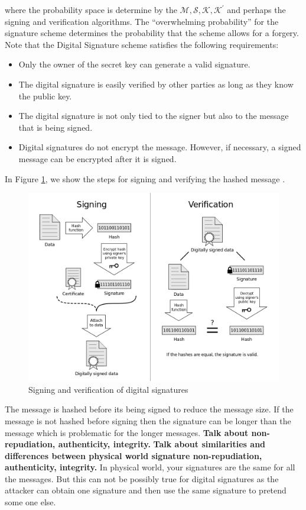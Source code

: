 	where the probability space is determine by the $\mathcal {M, S, K, K^{'}}$ and perhaps the signing and verification algorithms.
	The ``overwhelming probability'' for the signature scheme determines the probability that the scheme allows for a forgery.
	Note that the Digital Signature scheme satisfies the following requirements:
		\begin{itemize}
			\item Only the owner of the secret key can generate a valid signature.
			\item The digital signature is easily verified by other parties as long as they know the public key.
			\item The digital signature is not only tied to the signer but also to the message that is being signed.
			\item Digital signatures do not encrypt the message. However, if necessary, a signed message can be encrypted after it is signed.
		\end{itemize}
	In Figure \ref{fig:digita-signature}, we show the steps for signing and verifying the hashed message \cite{DigitalSignature}. 
	\begin{figure}[h!]
		\centering
		\includegraphics[scale = 0.4]{images/Digital_Signature_diagram.png}
		\caption{ Signing and verification of digital signatures}
		\label{fig:digita-signature}
	\end{figure}
	The message is hashed before its being signed to reduce the message size. 
	If the message is not hashed before signing then the signature can be longer than the message which is problematic for the longer messages.
	\textbf{Talk about non-repudiation, authenticity, integrity.}
	\textbf{Talk about similarities and differences between physical world signature non-repudiation, authenticity, integrity.}
	In physical world, your signatures are the same for all the messages. 
	But this can not be possibly true for digital signatures as the attacker can obtain one signature and then use the same signature to pretend some one else.


